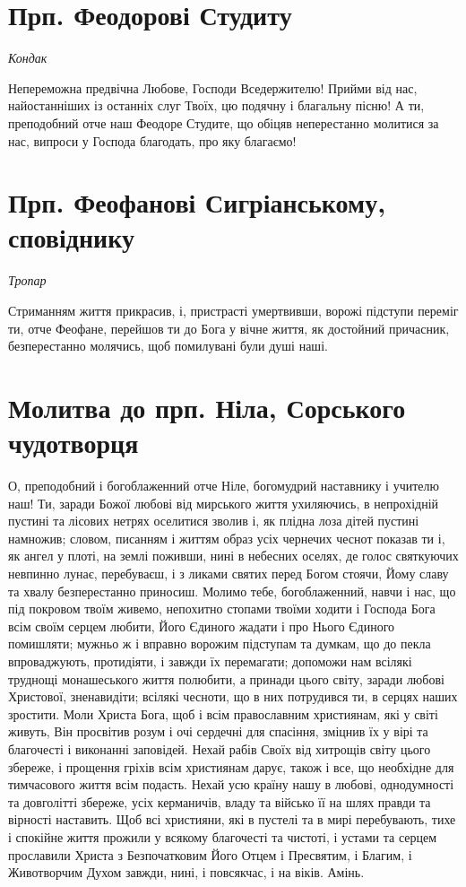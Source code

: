 \documentclass[chapters.tex]{subfiles}
\begin{document}
\section{Прп. Феодорові Студиту}
\emph{Кондак}

Непереможна предвічна Любове, Господи Вседержителю! Прийми від нас, найостанніших із останніх слуг Твоїх, цю подячну і благальну пісню! А ти, преподобний отче наш Феодоре Студите, що обіцяв неперестанно молитися за нас, випроси у Господа благодать, про яку благаємо!

\section{Прп. Феофанові Сигріанському, сповіднику}
\emph{Тропар}

Стриманням життя прикрасив, і, пристрасті умертвивши, ворожі підступи переміг ти, отче Феофане, перейшов ти до Бога у вічне життя, як достойний причасник, безперестанно молячись, щоб помилувані були душі наші.

\section{Молитва до прп. Ніла, Сорського чудотворця}
О, преподобний і богоблаженний отче Ніле, богомудрий наставнику і учителю наш! Ти, заради Божої любові від мирського життя ухиляючись, в непрохідній пустині та лісових нетрях оселитися зволив і, як плідна лоза дітей пустині намножив; словом, писанням і життям образ усіх чернечих чеснот показав ти і, як ангел у плоті, на землі поживши, нині в небесних оселях, де голос святкуючих невпинно лунає, перебуваєш, і з ликами святих перед Богом стоячи, Йому славу та хвалу безперестанно приносиш. Молимо тебе, богоблаженний, навчи і нас, що під покровом твоїм живемо, непохитно стопами твоїми ходити і Господа Бога всім своїм серцем любити, Його Єдиного жадати і про Нього Єдиного помишляти; мужньо ж і вправно ворожим підступам та думкам, що до пекла впроваджують, протидіяти, і завжди їх перемагати; допоможи нам всілякі труднощі монашеського життя полюбити, а принади цього світу, заради любові Христової, зненавидіти; всілякі чесноти, що в них потрудився ти, в серцях наших зростити. Моли Христа Бога, щоб і всім православним християнам, які у світі живуть, Він просвітив розум і очі сердечні для спасіння, зміцнив їх у вірі та благочесті і виконанні заповідей. Нехай рабів Своїх від хитрощів світу цього збереже, і прощення гріхів всім християнам дарує, також і все, що необхідне для тимчасового життя всім подасть. Нехай усю країну нашу в любові, однодумності та довголітті збереже, усіх керманичів, владу та військо її на шлях правди та вірності наставить. Щоб всі християни, які в пустелі та в мирі перебувають, тихе і спокійне життя прожили у всякому благочесті та чистоті, і устами та серцем прославили Христа з Безпочатковим Його Отцем і Пресвятим, і Благим, і Животворчим Духом завжди, нині, і повсякчас, і на віків. Амінь.
\end{document}
